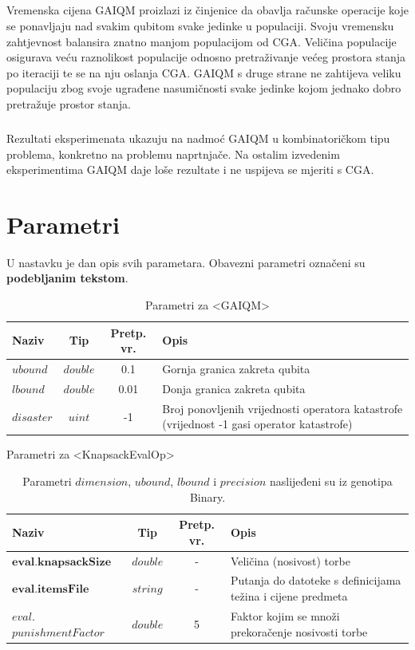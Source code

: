 \documentclass[times, utf8, zavrsni, numeric]{fer}
\begin{document}
\paragraph{}
Vremenska cijena GAIQM proizlazi iz činjenice da obavlja računske operacije koje se ponavljaju nad svakim qubitom svake jedinke u populaciji. Svoju vremensku zahtjevnost balansira znatno manjom populacijom od CGA. Veličina populacije osigurava veću raznolikost populacije odnosno pretraživanje većeg prostora stanja po iteraciji te se na nju oslanja CGA. GAIQM s druge strane ne zahtijeva veliku populaciju zbog svoje ugrađene nasumičnosti svake jedinke kojom jednako dobro pretražuje prostor stanja.

\paragraph{}
Rezultati eksperimenata ukazuju na nadmoć GAIQM u kombinatoričkom tipu problema, konkretno na problemu naprtnjače. Na ostalim izvedenim eksperimentima GAIQM daje loše rezultate i ne uspijeva se mjeriti s CGA.




\appendix
\chapter{Parametri} 
\label{ch:parametri}
U nastavku je dan opis svih parametara. Obavezni parametri označeni su \textbf{podebljanim tekstom}.

\begin{table}[htb]
\caption{Parametri za <GAIQM>}
\label{tbl:param_gaiqm}
\centering
\begin{tabular}{p{2cm}ccp{8cm}} \hline
Naziv & Tip & Pretp. vr. & Opis\\ \toprule
$ubound$ & $double$ & 0.1 & Gornja granica zakreta qubita \\
$lbound$ & $double$ & 0.01 & Donja granica zakreta qubita \\
$disaster$ & $uint$ & -1 & Broj ponovljenih vrijednosti operatora katastrofe (vrijednost -1 gasi operator katastrofe) \\ \bottomrule
\end{tabular}
\end{table}

\begin{table}[htb]
\caption{Parametri za <KnapsackEvalOp>}
\label{tbl:param_knapsack}
\centering
\caption*{\footnotesize Parametri $dimension$, $ubound$, $lbound$ i $precision$ naslijeđeni su iz genotipa Binary.}
\begin{tabular}{p{4cm}ccp{6cm}} \hline
Naziv & Tip & Pretp. vr. & Opis\\ \toprule
$\textbf{eval.knapsackSize}$ & $double$ & - & Veličina (nosivost) torbe \\
$\textbf{eval.itemsFile}$ & $string$ & - & Putanja do datoteke s definicijama težina i cijene predmeta \\
$eval.$ $punishmentFactor$ & $double$ & 5 & Faktor kojim se množi prekoračenje nosivosti torbe \\ \bottomrule
\end{tabular}
\end{table}
\end{document}
